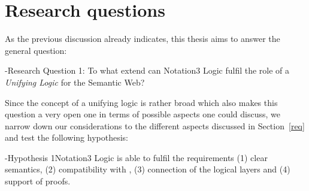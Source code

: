 %
% 
% 
% 
% 
% 
% 
% 
%  

\section{Research questions}
As the previous discussion already indicates, this thesis aims to answer the general question:

\hyp{Research Question 1:}{
To what extend can Notation3 Logic fulfil the role of a \emph{Unifying Logic} for the Semantic Web?
}

Since the concept of a unifying logic is rather broad which also makes this question a very open one in terms of possible aspects one could discuss, 
we narrow down our considerations
to the different aspects discussed in Section~\ref{req} and test the following hypothesis:

\hyp{Hypothesis 1}{Notation3 Logic is able to fulfil the requirements 
(1) clear semantics, %
(2) compatibility with \rdf, 
(3) connection of the logical layers %
and (4) support of proofs.
}


